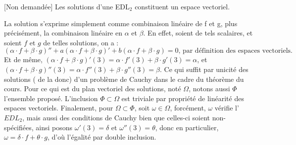 \documentclass{article}
\renewenvironment{question_kholle}[2][ ]
{
	\subsection{\texorpdfstring{#2}{}}
	\notblank{#1}
	{
		\noindent #1
		\bigbreak
	}
	{}
	\begin{proof}
}
{
	\end{proof}
}
\begin{document}
\begin{question_kholle}[
		Soient $(a,b)\in \mathbb{C}^2$, $f$ et $g$ les  solutions, définies sur $\mathbb{R}$ à valeurs
		dans $\mathbb{C}$, des problèmes de Cauchy suivants :
		\[
			\left\{ \begin{array}{cl}
				y'' +ay'+by = 0 \\
				y(3) = 1        \\
				y'(3) = 0
			\end{array} \right.
			\quad \text{et} \quad
			\left\{ \begin{array}{cl}
				y'' +ay'+by = 0 \\
				y(3) = 0        \\
				y'(3) = 1
			\end{array} \right.
		\]

		Comment s'exprime la solution définie sur $\mathbb{R}$ de $\left\{ \begin{array}{cl}
				y'' +ay'+by = 0 \\
				y(3) = \alpha   \\
				y'(3) = \beta
			\end{array} \right. $ pour $(\alpha, \beta)\in \mathbb{R}^2$ fixés ?

		Peut-on affirmer que le plan vectoriel des solutions définies sur $\mathbb{R}$ à valeurs dans
		$\mathbb{C}$ de $y'' + ay' + by = 0$ est $\{ \lambda \cdot f + \mu \cdot g  |
			(\lambda, \mu)\in \mathbb{C}^2\}$
	]
	{[Non demandée] Les solutions d'une EDL$_2$ constituent un espace vectoriel.}

	La solution s'exprime simplement comme combinaison linéaire de f et g, plus précisément, la
	combinaison linéaire en $\alpha$ et $\beta$. En effet, soient de tels scalaires, et soient $f$ et
	$g$ de telles solutions, on a :
	\[
		(\alpha \cdot f + \beta \cdot g)'' + a (\alpha \cdot f + \beta \cdot g)' + b (\alpha \cdot f +
		\beta \cdot g) = 0 \text{, par définition des espaces vectoriels.}
	\]
	Et de même, $(\alpha \cdot f + \beta \cdot g)'(3) = \alpha \cdot f'(3) + \beta \cdot g'(3) = \alpha$,
	et $(\alpha \cdot f + \beta \cdot g)''(3) = \alpha \cdot f''(3) + \beta \cdot g''(3) = \beta$.
	\newline
	Ce qui suffit par unicité des solutions ( de la donc) d'un problème de Cauchy dans le cadre du
	théorème du cours.
	\newline
	Pour ce qui est du plan vectoriel des solutions, noté $\Omega$, notons aussi $\Phi$ l'ensemble proposé.
	L'inclusion $\Phi \subset \Omega$ est triviale par propriété de linéarité des espaces vectoriels.
	Finalement, pour $\Omega \subset \Phi$, soit $\omega \in \Omega$, forcément, $\omega$ vérifie
	l'$EDL_2$, mais aussi des conditions de Cauchy bien que celles-ci soient non-spécifiées, ainsi
	posons $\omega'(3) = \delta$ et $\omega''(3) = \theta$, donc en particulier, $ \omega =
		\delta \cdot f + \theta \cdot g$, d'où l'égalité par double inclusion.
\end{question_kholle}
\end{document}
